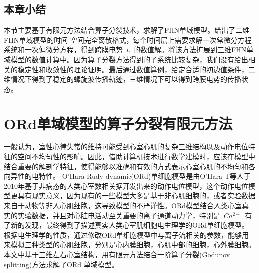 \documentclass[twoside,UTF8]{nputhesis}
\begin{document}
\section{本章小结}
本节主要基于有限元方法结合算子分裂技术，求解了FHN单域模型。给出了二维FHN单域模型的时间-空间完全离散格式，每个时间层上需要求解一次常微分方程系统和一次偏微分方程，得到跨膜电势~$u$~的数值解。将该方法扩展到三维FHN单域模型的数值计算中。因为算子分裂方法得到的子系统比较复杂，我们没有给出相关的稳定性和收敛性的理论证明。最后通过数值算例，给定合适的初边值条件，二维情况下得到了稳定的螺旋波传播轨迹，三维情况下可以得到跨膜电势的传播状态。

\chapter{ORd单域模型的算子分裂有限元方法}

一般认为，室性心律失常的维持可能受到心室心肌的复杂三维结构以及动作电位特征的空间不均匀性的影响。因此，借助计算机技术进行数学建模时，应该在模型中结合重要的解剖学特征，使得能够以准确和有效的方式表示心室心肌的不均匀和各向异性的电特性。
O’Hara-Rudy dynamic(ORd)单细胞模型是由O’Hara T等人于2010年基于非病态的人类心室数相关据开发出来的动作电位模型，这个动作电位模型更具有现实意义，因为现有的一些模型大多是基于非心肌细胞的，或者实验数据来自于动物等非人心肌细胞，这导致模型的不严谨性。ORd模型结合人类心室真实的实验数据，并且对心脏电活动至关重要的离子通道动力学，特别是~$Ca^{2+}$~有了新的发现，最终得到了描述真实人类心室肌细胞电生理学的ORd单细胞模型。根据电生理学的性质，通过修改ORd单细胞模型中与离子流相关的参数，能够用来模拟三种类型的心肌细胞，分别是心内膜细胞，心肌中部的细胞，心外膜细胞\cite{ord1}。本文中基于三维左右心室结构，用有限元方法结合一阶算子分裂(Godunov splitting)方法求解了ORd 单域模型。
\end{document}
